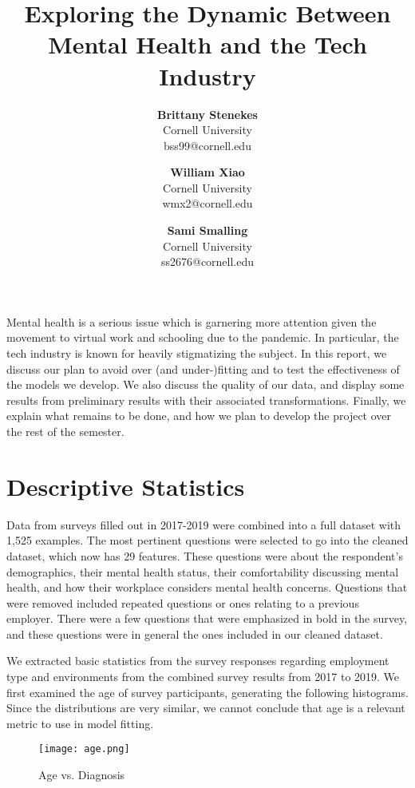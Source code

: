 \documentclass[times, twocolumn]{article}
\title{\textbf{{\Large Exploring the Dynamic Between Mental Health and the Tech Industry}}}
\author{
    \normalsize
    \textbf{Brittany Stenekes} \\
    \normalsize
    Cornell University \\
    \normalsize
    {\fontfamily{pcr}\selectfont bss99@cornell.edu }
    
    \and
    \normalsize
    \normalsize
    \textbf{William Xiao} \\
    \normalsize
    Cornell University \\
    \normalsize
    {\fontfamily{pcr}\selectfont wmx2@cornell.edu }
  
    \and
    \normalsize
    \textbf{Sami Smalling} \\
    \normalsize
    Cornell University \\
    \normalsize
    {\fontfamily{pcr}\selectfont ss2676@cornell.edu }
}
\date{}
\renewenvironment{abstract}
 {\large
  \begin{center}
  \bfseries \abstractname\vspace{-.5em}\vspace{0pt}
  \end{center}
    \small
  \list{}{%
    \setlength{\leftmargin}{5mm}%
    \setlength{\rightmargin}{\leftmargin}%
  }%
  \item\relax}
 {\endlist}
\begin{document}
\maketitle


\begin{abstract}
Mental health is a serious issue which is garnering more attention given the 
movement to virtual work and schooling due to the pandemic. In particular, the 
tech industry is known for heavily stigmatizing the subject. In this report, we 
discuss our plan to avoid over (and under-)fitting and to test the effectiveness 
of the models we develop. We also discuss the quality of our data, and display 
some results from preliminary results with their associated transformations. 
Finally, we explain what remains to be done, and how we plan to develop the 
project over the rest of the semester.
\end{abstract}

\fontsize{9.5}{9}\selectfont

\fontsize{10}{12}\selectfont

\section{Descriptive Statistics}

Data from surveys filled out in 2017-2019 were combined into a full dataset 
with 1,525 examples. The most pertinent questions were selected to go into the
cleaned dataset, which now has 29 features. These questions were about the 
respondent’s demographics, their mental health status, their comfortability 
discussing mental health, and how their workplace considers mental health 
concerns. Questions that were removed included repeated questions or ones 
relating to a previous employer. There were a few questions that were emphasized 
in bold in the survey, and these questions were in general the ones included in 
our cleaned dataset. 

We extracted basic statistics from the survey responses regarding employment 
type and environments from the combined survey results from 2017 to 2019. We 
first examined the age of survey participants, generating the following 
histograms. Since the distributions are very similar, we cannot conclude that 
age is a relevant metric to use in model fitting.

\begin{figure}[h]
    \centering
    \texttt{[image: age.png]}
    \caption{Age vs. Diagnosis}
    \label{fig:age}
\end{figure}
\end{document}
